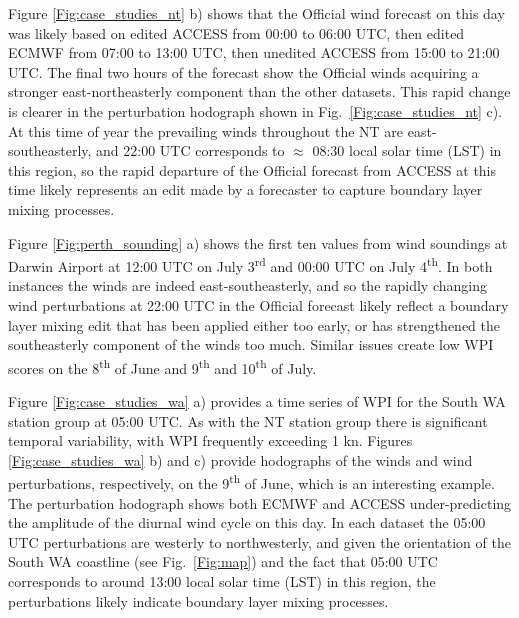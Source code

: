 \documentclass{ametsoc}
\begin{document}
Figure \ref{Fig:case_studies_nt} b) shows that the Official wind forecast on this day was likely based on edited ACCESS from 00:00 to 06:00 UTC, then edited ECMWF from 07:00 to 13:00 UTC, then unedited ACCESS from 15:00 to 21:00 UTC. The final two hours of the forecast show the Official winds acquiring a stronger east-northeasterly component than the other datasets. This rapid change is clearer in the perturbation hodograph shown in Fig.~\ref{Fig:case_studies_nt} c). At this time of year the prevailing winds throughout the NT are east-southeasterly, and 22:00 UTC corresponds to $\approx$ 08:30 local solar time (LST) in this region, so the rapid departure of the Official forecast from ACCESS at this time likely represents an edit made by a forecaster to capture boundary layer mixing processes. 

Figure \ref{Fig:perth_sounding} a) shows the first ten values from wind soundings at Darwin Airport at 12:00 UTC on July 3\textsuperscript{rd} and 00:00 UTC on July 4\textsuperscript{th}. In both instances the winds are indeed east-southeasterly, and so the rapidly changing wind perturbations at 22:00 UTC in the Official forecast likely reflect a boundary layer mixing edit that has been applied either too early, or has strengthened the southeasterly component of the winds too much. Similar issues create low WPI scores on the 8\textsuperscript{th} of June and 9\textsuperscript{th} and 10\textsuperscript{th} of July.

Figure \ref{Fig:case_studies_wa} a) provides a time series of WPI for the South WA station group at 05:00 UTC. As with the NT station group there is significant temporal variability, with WPI frequently exceeding 1 kn. Figures \ref{Fig:case_studies_wa} b) and c) provide hodographs of the winds and wind perturbations, respectively, on the 9\textsuperscript{th} of June, which is an interesting example. The perturbation hodograph shows both ECMWF and ACCESS under-predicting the amplitude of the diurnal wind cycle on this day. In each dataset the 05:00 UTC perturbations are westerly to northwesterly, and given the orientation of the South WA coastline (see Fig.~\ref{Fig:map}) and the fact that 05:00 UTC corresponds to around 13:00 local solar time (LST) in this region, the perturbations likely indicate boundary layer mixing processes. 
\end{document}

